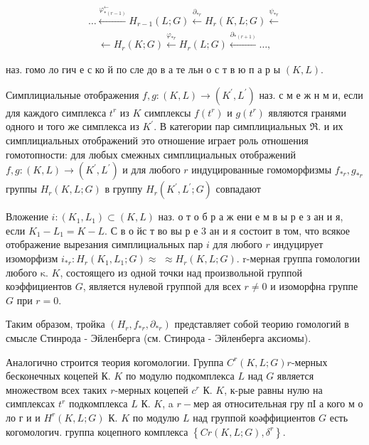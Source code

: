 \documentclass[10pt]{article}
\begin{document}
\[

\begin{gathered}

\ldots \stackrel{\varphi_{*(r-1)}^{\longleftarrow}}{\longleftarrow} H_{r-1}(L ; G) \stackrel{\partial_{* r}}{\longleftarrow} H_{r}(K, L ; G) \stackrel{\psi_{* r}}{\longleftarrow} \\

\quad \longleftarrow H_{r}(K ; G) \stackrel{\varphi_{* r}}{\longleftarrow} H_{r}(L ; G) \stackrel{\partial_{*(r+1)}}{\longleftarrow} \ldots,

\end{gathered}

\]



наз. гомо ло гич е с ко й по сле до в а те льн о с т в ю п а р ы $(K, L)$.



Симплициальные отображения $f, g:(K, L) \rightarrow\left(K^{\prime}, L^{\prime}\right)$ наз. с м е ж н м и, если для каждого симплекса $t^{r}$ из $K$ симплексы $f\left(t^{r}\right)$ и $g\left(t^{r}\right)$ являются гранями одного и того же симплекса из $K^{\prime}$. В категории пар симплициальных $\Re$. и их симплициальных отображений это отношение играет роль отношения гомотопности: для любых смежных симплициальных отображений $f, g:(K, L) \rightarrow\left(K^{\prime}, L^{\prime}\right)$ и для любого $r$ индуцированные гомоморфизмы $f_{* r}, g_{* r}$ группы $H_{r}(K, L ; G)$ в группу $H_{r}\left(K^{\prime}, L^{\prime} ; G\right)$ совпадают



Вложение $i:\left(K_{1}, L_{1}\right) \subset(K, L)$ наз. о т о б р а ж ени е м в ы р е з ан и я, если $K_{1}-L_{1}=K-L$. С в о йс т во вы р е 3 ан и я состоит в том, что всякое отображение вырезания симплициальных пар $i$ для любого $r$ индуцирует изоморфизм $i_{* r}: H_{r}\left(K_{1}, L_{1} ; G\right) \approx$ $\approx H_{r}(K, L ; G)$. r-мерная группа гомологии любого $\mathrm{\kappa}$. $K$, состоящего из одной точки над произвольной группой коэффициентов $G$, является нулевой группой для всех $r \neq 0$ и изоморфна группе $G$ при $r=0$.



Таким образом, тройка $\left(H_{r}, f_{* r}, \partial_{* r}\right)$ представляет собой теорию гомологий в смысле Стинрода - Эйленберга (см. Стинрода - Эйленберга аксиомы).



Аналогично строится теория когомологии. Группа $C^{r}(K, L ; G) r$-мерных бесконечных коцепей $К$. $K$ по модулю подкомплекса $L$ над $G$ является множеством всех таких $r$-мерных коцепей $c^{r}$ К. $K$, к-рые равны нулю на симплексах $t^{r}$ подкомплекса $L$ К. $K$, a $r-м е р$ ая относительная гру пІ а кого м о ло г и и $H^{r}(K, L ; G)$ К. $K$ по модулю $L$ над группой коәффициентов $G$ есть когомологич. группа коцепного комплекса $\left\{C r(K, L ; G), \delta^{r}\right\}$.
\end{document}
